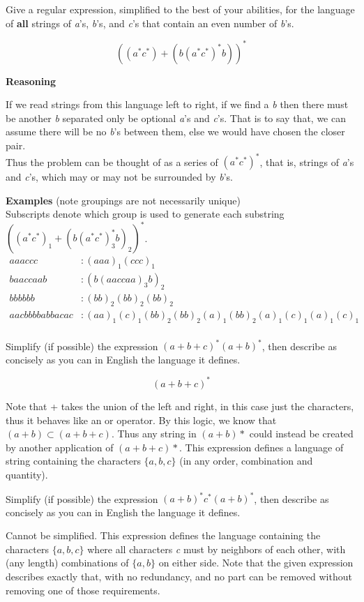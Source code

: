 \documentclass[12pt]{jhwhw}
\begin{document}
\problem{}

	Give a regular expression, simplified to the best of your abilities, for the language of \textbf{all} strings
	of \textit{a}'s, \textit{b}'s, and \textit{c}'s that contain an even number of \textit{b}'s.

\solution

	$$
		((a^*c^*)+(b(a^*c^*)^*b))^*
	$$

	\textbf{Reasoning}

	If we read strings from this language left to right, if we find a \textit{b} then there must be another \textit{b}
	separated only be optional \textit{a}'s and \textit{c}'s. That is to say that, we can assume there will be 
	no \textit{b}'s between them, else we would have chosen the closer pair.
	\\
	Thus the problem can be thought of as a series of $(a^*c^*)^*$, that is, strings of \textit{a}'s and
	\textit{c}'s, which may or may not be surrounded by \textit{b}'s.

	\bigbreak
	\textbf{Examples} (note groupings are not necessarily unique) \\
	Subscripts denote which group is used to generate each substring $((a^*c^*)_1+(b(a^*c^*)_3^*b)_2)^*$. \\
	\begin{align*}
		aaaccc &: 
			(aaa)_1(ccc)_1 \\
		baaccaab &: 
			(b(aaccaa)_3b)_2 \\
		bbbbbb &: 
			(bb)_2(bb)_2(bb)_2 \\
		aacbbbbabbacac &: 
			(aa)_1(c)_1(bb)_2(bb)_2(a)_1(bb)_2(a)_1(c)_1(a)_1(c)_1 \\
	\end{align*}

\problem{}

	Simplify (if possible) the expression $(a+b+c)^*(a+b)^*$, then describe as concisely as you can
	in English the language it defines.

\solution

	$$
		(a+b+c)^*
	$$

	Note that + takes the union of the left and right, in this case just the characters, 
	thus it behaves like an or operator.
	By this logic, we know that $(a+b) \subset (a+b+c)$.
	Thus any string in $(a+b)*$ could instead be created by another application of $(a+b+c)*$.
	\bigbreak
	This expression defines a language of string containing the characters $\{a,b,c\}$ (in any order, combination
	and quantity).

\problem{}

	Simplify (if possible) the expression $(a+b)^*c^*(a+b)^*$, then describe as concisely as you can
	in English the language it defines.

\solution

	Cannot be simplified.
	\bigbreak
	This expression defines the language containing the characters $\{a,b,c\}$ where all characters \textit{c} must
	by neighbors of each other, with (any length) combinations of $\{a,b\}$ on either side.
	Note that the given expression describes exactly that, with no redundancy, 
	and no part can be removed without removing one of those requirements.
\end{document}
